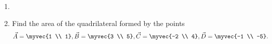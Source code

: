 \renewcommand{\theequation}{\theenumi}
\renewcommand{\thefigure}{\theenumi}
\begin{enumerate}[label=\thesubsection.\arabic*.,ref=\thesubsection.\theenumi]

\item 

%
\item Find the area of the quadrilateral formed by the points
\begin{align}
\begin{split}
\vec{A} = \myvec{1 \\ 1}, 
\vec{B} = \myvec{3 \\ 5}, 
\vec{C} = \myvec{-2 \\ 4}, 
\vec{D} = \myvec{-1 \\ -5}.
\end{split}
\end{align}
\solution

\end{enumerate}
